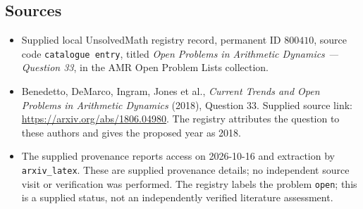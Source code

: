 \documentclass[11pt]{article}
\begin{document}
\subsection{Sources}
\begin{itemize}
\item Supplied local UnsolvedMath registry record, permanent ID \(800410\), source code \texttt{catalogue entry}, titled \emph{Open Problems in Arithmetic Dynamics --- Question 33}, in the AMR Open Problem Lists collection.
\item Benedetto, DeMarco, Ingram, Jones et al., \emph{Current Trends and Open Problems in Arithmetic Dynamics} (2018), Question 33. Supplied source link: \url{https://arxiv.org/abs/1806.04980}. The registry attributes the question to these authors and gives the proposed year as 2018.
\item The supplied provenance reports access on 2026-10-16 and extraction by \texttt{arxiv\_latex}. These are supplied provenance details; no independent source visit or verification was performed. The registry labels the problem \texttt{open}; this is a supplied status, not an independently verified literature assessment.
\end{itemize}
\end{document}
